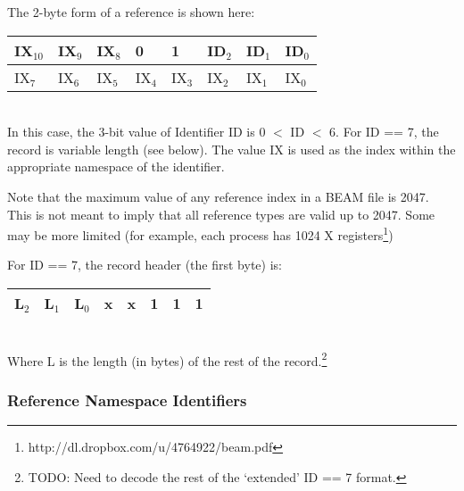 \documentclass{article}
\begin{document}
The 2-byte form of a reference is shown here:\\
\begin{tabular}{ |l|l|l|l|l|l|l|l| } \hline
IX$_{10}$ & IX$_9$ & IX$_8$ &   0    &   1    & ID$_2$ & ID$_1$ & ID$_0$  \\ \hline
IX$_7$   & IX$_6$ & IX$_5$ & IX$_4$ & IX$_3$ & IX$_2$ & IX$_1$ & IX$_0$  \\ \hline
\end{tabular}\\

In this case, the 3-bit value of Identifier ID is 0 $<$ ID $<$ 6. 
For ID == 7, the record is variable length (see below).
The value IX is used as the index within the appropriate 
namespace of the identifier.

Note that the maximum value of any reference index in a BEAM file is 2047.
This is not meant to imply that all reference types are valid up to 2047.  
Some may be more limited (for example, each process has 1024
X registers\footnote{http://dl.dropbox.com/u/4764922/beam.pdf})

For ID == 7, the record header (the first byte) is:\\
\begin{tabular}{ |l|l|l|l|l|l|l|l| } \hline
L$_2$ & L$_1$ & L$_0$ & x &   x   & 1 & 1 & 1 \\ \hline
\end{tabular}\\
Where L is the length (in bytes) of the rest of the record.\footnote{TODO:
Need to decode the rest of the `extended' ID == 7 format.}


\subsubsection{Reference Namespace Identifiers}
\end{document}
